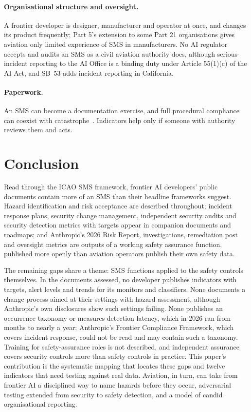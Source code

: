 \documentclass[11pt]{article}
\begin{document}
\paragraph{Organisational structure and oversight.} A frontier developer is designer, manufacturer and operator at once, and changes its product frequently; Part 5's extension to some Part 21 organisations gives aviation only limited experience of SMS in manufacturers. No AI regulator accepts and audits an SMS as a civil aviation authority does, although serious-incident reporting to the AI Office is a binding duty under Article 55(1)(c) of the AI Act, and SB~53 adds incident reporting in California.

\paragraph{Paperwork.} An SMS can become a documentation exercise, and full procedural compliance can coexist with catastrophe~\cite{barkett2026}. Indicators help only if someone with authority reviews them and acts.

\section{Conclusion}\label{sec:conclusion}

Read through the ICAO SMS framework, frontier AI developers' public documents contain more of an SMS than their headline frameworks suggest. Hazard identification and risk acceptance are described throughout; incident response plans, security change management, independent security audits and security detection metrics with targets appear in companion documents and roadmaps; and Anthropic's 2026 Risk Report, investigations, remediation post and oversight metrics are outputs of a working safety assurance function, published more openly than aviation operators publish their own safety data.

The remaining gaps share a theme: SMS functions applied to the safety controls themselves. In the documents assessed, no developer publishes indicators with targets, alert levels and trends for its monitors and classifiers. None documents a change process aimed at their settings with hazard assessment, although Anthropic's own disclosures show such settings failing. None publishes an occurrence taxonomy or measures detection latency, which in 2026 ran from months to nearly a year; Anthropic's Frontier Compliance Framework, which covers incident response, could not be read and may contain such a taxonomy. Training for safety-assurance roles is not described, and independent assurance covers security controls more than safety controls in practice. This paper's contribution is the systematic mapping that locates these gaps and twelve indicators that need testing against real data. Aviation, in turn, can take from frontier AI a disciplined way to name hazards before they occur, adversarial testing extended from security to safety detection, and a model of candid organisational reporting.
\end{document}
